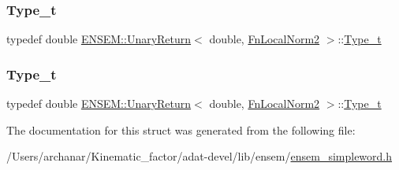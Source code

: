 \mbox{\label{structENSEM_1_1UnaryReturn_3_01double_00_01FnLocalNorm2_01_4_aeffdb3ddbb9a4422627961295ff3ee26}} 
\subsubsection{\texorpdfstring{Type\_t}{Type\_t}\hspace{0.1cm}{\footnotesize\ttfamily [2/3]}}
{\footnotesize\ttfamily typedef double \mbox{\hyperlink{structENSEM_1_1UnaryReturn}{E\+N\+S\+E\+M\+::\+Unary\+Return}}$<$ double, \mbox{\hyperlink{structENSEM_1_1FnLocalNorm2}{Fn\+Local\+Norm2}} $>$\+::\mbox{\hyperlink{structENSEM_1_1UnaryReturn_3_01double_00_01FnLocalNorm2_01_4_aeffdb3ddbb9a4422627961295ff3ee26}{Type\+\_\+t}}}

\mbox{\label{structENSEM_1_1UnaryReturn_3_01double_00_01FnLocalNorm2_01_4_aeffdb3ddbb9a4422627961295ff3ee26}} 
\subsubsection{\texorpdfstring{Type\_t}{Type\_t}\hspace{0.1cm}{\footnotesize\ttfamily [3/3]}}
{\footnotesize\ttfamily typedef double \mbox{\hyperlink{structENSEM_1_1UnaryReturn}{E\+N\+S\+E\+M\+::\+Unary\+Return}}$<$ double, \mbox{\hyperlink{structENSEM_1_1FnLocalNorm2}{Fn\+Local\+Norm2}} $>$\+::\mbox{\hyperlink{structENSEM_1_1UnaryReturn_3_01double_00_01FnLocalNorm2_01_4_aeffdb3ddbb9a4422627961295ff3ee26}{Type\+\_\+t}}}



The documentation for this struct was generated from the following file\+:\begin{DoxyCompactItemize}
\item 
/\+Users/archanar/\+Kinematic\+\_\+factor/adat-\/devel/lib/ensem/\mbox{\hyperlink{adat-devel_2lib_2ensem_2ensem__simpleword_8h}{ensem\+\_\+simpleword.\+h}}\end{DoxyCompactItemize}
